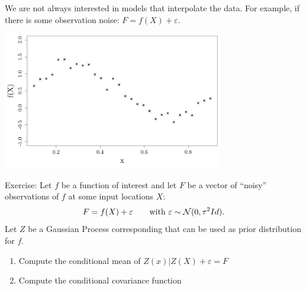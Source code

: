 \documentclass{beamer}
\begin{document}
\begin{frame}{}
We are not always interested in models that interpolate the data. For example, if there is some observation noise: $F = f(X) + \varepsilon$.
\begin{center}
\includegraphics[height=6cm]{figures/R/noisyObs} 
\end{center}
\end{frame}

\begin{frame}{}
\begin{exampleblock}{Exercise:}
	Let $f$ be a function of interest and let $F$ be a vector of ``noisy'' observations of $f$ at some input locations $X$:
	$$ F = f(X) + \varepsilon \text{\qquad with } \varepsilon \sim \mathcal{N}(0, \tau^2 Id). $$
	Let $Z$ be a Gaussian Process corresponding that can be used as prior distribution for $f$.
\begin{enumerate}
	\item Compute the conditional mean of $Z(x) | Z(X)+\varepsilon = F$
	\item Compute the conditional covariance function
\end{enumerate}
\end{exampleblock}
\end{frame}
\end{document}
